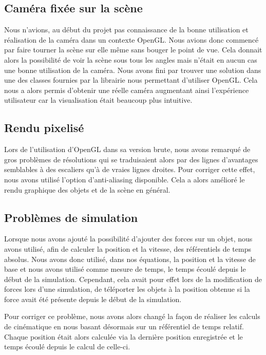 \documentclass[11pt]{report}
\begin{document}
\subsection{Caméra fixée sur la scène}

Nous n'avions, au début du projet pas connaissance de la bonne utilisation et réalisation de la caméra dans un contexte OpenGL. Nous avions
donc commencé par faire tourner la scène sur elle même sans bouger le point de vue. Cela donnait alors la possibilité de voir la scène sous tous les angles mais n'était en aucun cas une bonne utilisation de la caméra. Nous avons fini par trouver une solution dans une des classes fournies par la librairie nous permettant d'utiliser OpenGL. Cela nous a alors permis d'obtenir une réelle caméra augmentant ainsi l'expérience utilisateur car la visualisation était beaucoup plus intuitive.

\newpage

\subsection{Rendu pixelisé}


Lors de l'utilisation d'OpenGL dans sa version brute, nous avons remarqué de gros problèmes de résolutions qui se traduisaient alors
par des lignes d'avantages semblables à des escaliers qu'à de vraies lignes droites. Pour corriger cette effet, nous avons utilisé l'option
d'anti-aliasing disponible. Cela a alors amélioré le rendu graphique des objets et de la scène en général.

\subsection{Problèmes de simulation}

Lorsque nous avons ajouté la possibilité d'ajouter des forces sur un objet, nous avons utilisé, afin de calculer la position et la vitesse, des
référentiels de temps absolus. Nous avons donc utilisé, dans nos équations, la position et la vitesse de base et nous avons utilisé comme mesure
de temps, le temps écoulé depuis le début de la simulation. Cependant, cela avait pour effet lors de la modification de forces lors d'une
simulation, de téléporter les objets à la position obtenue si la force avait été présente depuis le début de la simulation.

Pour corriger ce problème, nous avons alors changé la façon de réaliser les calculs de cinématique en nous basant désormais sur un référentiel de temps relatif. Chaque position était alors calculée via la dernière position enregistrée et le temps écoulé depuis le calcul de celle-ci.
\end{document}
